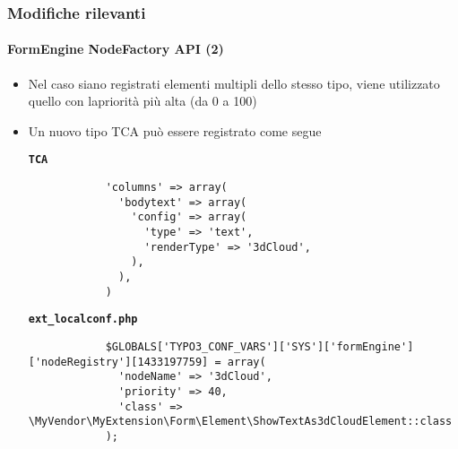 \begin{frame}[fragile]
	\frametitle{Modifiche rilevanti}
	\framesubtitle{FormEngine NodeFactory API (2)}

	\lstset{basicstyle=\tiny\ttfamily}

	\begin{itemize}

		\item Nel caso siano registrati elementi multipli dello stesso tipo, viene utilizzato quello con lapriorità più alta (da 0 a 100)

		\item Un nuovo tipo TCA può essere registrato come segue

		\smaller\textbf{\texttt{TCA}}
		\begin{lstlisting}
			'columns' => array(
			  'bodytext' => array(
			    'config' => array(
			      'type' => 'text',
			      'renderType' => '3dCloud',
			    ),
			  ),
			)
		\end{lstlisting}

		\smaller\textbf{\texttt{ext\_localconf.php}}
		\begin{lstlisting}
			$GLOBALS['TYPO3_CONF_VARS']['SYS']['formEngine']['nodeRegistry'][1433197759] = array(
			  'nodeName' => '3dCloud',
			  'priority' => 40,
			  'class' => \MyVendor\MyExtension\Form\Element\ShowTextAs3dCloudElement::class
			);
		\end{lstlisting}

	\end{itemize}

\end{frame}


